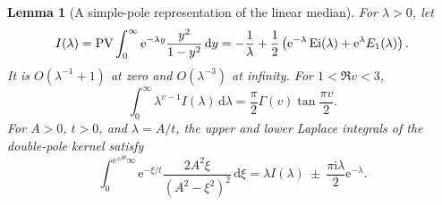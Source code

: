 \documentclass[11pt,a4paper]{article}
\numberwithin{equation}{section}
\newtheorem{lemma}[theorem]{Lemma}
\theoremstyle{definition}\newtheorem{definition}[theorem]{Definition}
\theoremstyle{remark}\newtheorem{remark}[theorem]{Remark}
\newcommand{\ii}{\mathrm i}\newcommand{\e}{\mathrm e}
\newcommand{\dd}{\,\mathrm d}\newcommand{\Li}{\operatorname{Li}}
\begin{document}
\begin{lemma}[A simple-pole representation of the linear median]
\label{lem:I}
For $\lambda>0$, let
\begin{equation}
 I(\lambda)=\PV\int_0^\infty \e^{-\lambda y}\frac{y^2}{1-y^2}\dd y
 =-\frac1\lambda+
 \frac12\left(\e^{-\lambda}\operatorname{Ei}(\lambda)
                    +\e^\lambda E_1(\lambda)\right).
 \label{eq:I}
\end{equation}
It is $O(\lambda^{-1}+1)$ at zero and $O(\lambda^{-3})$ at infinity.
For $1<\Re v<3$,
\begin{equation}
 \int_0^\infty\lambda^{v-1}I(\lambda)\dd\lambda
                      =\frac\pi2\Gamma(v)\tan\frac{\pi v}{2}.
 \label{eq:I-Mellin}
\end{equation}
For $A>0$, $t>0$, and $\lambda=A/t$, the upper and lower Laplace
integrals of the double-pole kernel satisfy
\begin{equation}
 \int_0^{\e^{\pm\ii\theta}\infty}
 \e^{-\xi/t}\frac{2A^2\xi}{(A^2-\xi^2)^2}\dd\xi
 =\lambda I(\lambda)\ \pm\ \frac{\pi\ii\lambda}{2}\e^{-\lambda}.
 \label{eq:double-Laplace}
\end{equation}
\end{lemma}
\end{document}
